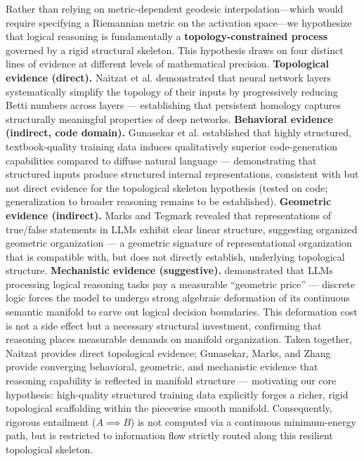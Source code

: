 \documentclass{article}
\begin{document}
Rather than relying on metric-dependent geodesic interpolation---which would require specifying a Riemannian metric on the activation space---we hypothesize that logical reasoning is fundamentally a \textbf{topology-constrained process} governed by a rigid structural skeleton. This hypothesis draws on four distinct lines of evidence at different levels of mathematical precision. \textbf{Topological evidence (direct).} Naitzat et al. \citep{Naitzat2020topology} demonstrated that neural network layers systematically simplify the topology of their inputs by progressively reducing Betti numbers across layers — establishing that persistent homology captures structurally meaningful properties of deep networks. \textbf{Behavioral evidence (indirect, code domain).} Gunasekar et al. \citep{Gunasekar2023textbooks} established that highly structured, textbook-quality training data induces qualitatively superior code-generation capabilities compared to diffuse natural language --- demonstrating that structured inputs produce structured internal representations, consistent with but not direct evidence for the topological skeleton hypothesis (tested on code; generalization to broader reasoning remains to be established). \textbf{Geometric evidence (indirect).} Marks and Tegmark \citep{Marks2023geometry} revealed that representations of true/false statements in LLMs exhibit clear linear structure, suggesting organized geometric organization — a geometric signature of representational organization that is compatible with, but does not directly establish, underlying topological structure. \textbf{Mechanistic evidence (suggestive).} \citet{Zhang2026geometric} demonstrated that LLMs processing logical reasoning tasks pay a measurable ``geometric price'' — discrete logic forces the model to undergo strong algebraic deformation of its continuous semantic manifold to carve out logical decision boundaries. This deformation cost is not a side effect but a necessary structural investment, confirming that reasoning places measurable demands on manifold organization. Taken together, Naitzat provides direct topological evidence; Gunasekar, Marks, and Zhang provide converging behavioral, geometric, and mechanistic evidence that reasoning capability is reflected in manifold structure — motivating our core hypothesis: high-quality structured training data explicitly forges a richer, rigid topological scaffolding within the piecewise smooth manifold. Consequently, rigorous entailment ($A \implies B$) is not computed via a continuous minimum-energy path, but is restricted to information flow strictly routed along this resilient topological skeleton.
\end{document}
